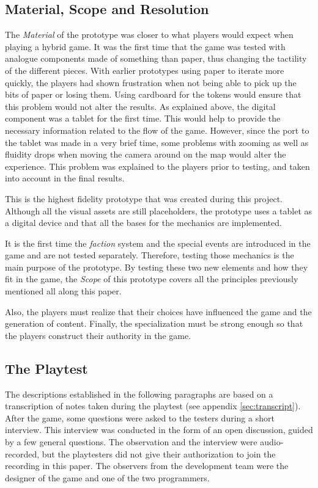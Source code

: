 \subsection{Material, Scope and Resolution}
The \textit{Material} of the prototype was closer to what players would expect when playing a hybrid game. It was the first time that the game was tested with analogue components made of something than paper, thus changing the tactility of the different pieces. With earlier prototypes using paper to iterate more quickly, the players had shown frustration when not being able to pick up the bits of paper or losing them. Using cardboard for the tokens would ensure that this problem would not alter the results. As explained above, the digital component was a tablet for the first time. This would help to provide the necessary information related to the flow of the game. However, since the port to the tablet was made in a very brief time, some problems with zooming as well as fluidity drops when moving the camera around on the map would alter the experience. This problem was explained to the players prior to testing, and taken into account in the final results.

This is the highest fidelity prototype that was created during this project. Although all the visual assets are still placeholders, the prototype uses a tablet as a digital device and that all the bases for the mechanics are implemented. 

It is the first time the \textit{faction} system and the special events are introduced in the game and are not tested separately. Therefore, testing those mechanics is the main purpose of the prototype. By testing these two new elements and how they fit in the game, the \textit{Scope} of this prototype covers all the principles previously mentioned all along this paper. 

Also, the players must realize that their choices have influenced the game and the generation of content. Finally, the specialization must be strong enough so that the players construct their authority in the game. 

\subsection{The Playtest}
The descriptions established in the following paragraphs are based on a transcription of notes taken during the playtest (see appendix \ref{sec:transcript}). After the game, some questions were asked to the testers during a short interview. This interview was conducted in the form of an open discussion, guided by a few general questions. The observation and the interview were audio-recorded, but the playtesters did not give their authorization to join the recording in this paper. The observers from the development team were the designer of the game and one of the two programmers.

